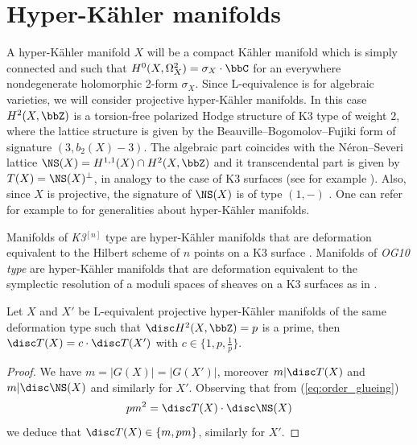 \documentclass{amsart}
\begin{document}
\section{Hyper-Kähler manifolds}\label{sec:hyper-Kähler}
A hyper-Kähler manifold \(X\) will be a compact Kähler manifold which is simply connected and such that \(H^0(X,\Omega^2_X)=\sigma_X\cdot \bbC\) for an everywhere nondegenerate holomorphic 2-form \(\sigma_X\). Since L-equivalence is for algebraic varieties, we will consider projective hyper-Kähler manifolds. In this case \(H^2(X,\bbZ)\) is a torsion-free polarized Hodge structure of K3 type of weight \(2\), where the lattice structure is given by the Beauville--Bogomolov--Fujiki form of signature \((3,b_2(X)-3)\). The algebraic part coincides with the Néron--Severi lattice \(\NS(X)=H^{1,1}(X)\cap H^2(X,\bbZ)\) and it transcendental part is given by \(T(X)=\NS(X)^\perp\), in analogy to the case of K3 surfaces (see for example \cite[Lemma 3.1]{huybrechts2016lectures}). Also, since \(X\) is projective, the signature of \(\NS(X)\) is of type \((1,-)\) \cite[Proposition 26.13]{gross2012calabi}. One can refer for example to \cite{gross2012calabi,debarre2022hyper} for generalities about hyper-Kähler manifolds.

Manifolds of \textit{K3\(^{[n]}\)} type are hyper-Kähler manifolds that are deformation equivalent to the Hilbert scheme of \(n\) points on a K3 surface \cite{beauville1983varietes}. Manifolds of \textit{OG10 type} are hyper-Kähler manifolds that are deformation equivalent to the symplectic resolution of a moduli spaces of sheaves on a K3 surfaces as in \cite{OG10}.



\begin{lemma}\label{lem:disc_same_deformation_disc_p}
Let \(X\) and \(X'\) be L-equivalent projective hyper-Kähler manifolds of the same deformation type such that \(\disc H^2(X,\bbZ)=p\) is a prime, then \(\disc T(X)=c\cdot \disc T(X')\) with \(c\in \{1,p,\frac{1}{p}\}\).
\end{lemma}
\begin{proof}
    We have \(m=|G(X)|=|G(X')|\), moreover \(m|\disc T(X)\) and \(m|\disc \NS(X)\) and similarly for \(X'\). Observing that from (\ref{eq:order_glueing}) \[p m^2= \disc T(X) \cdot \disc \NS(X)\] we deduce that \(\disc T(X)\in \{m, pm\}\), similarly for \(X'\).
\end{proof}
\end{document}
